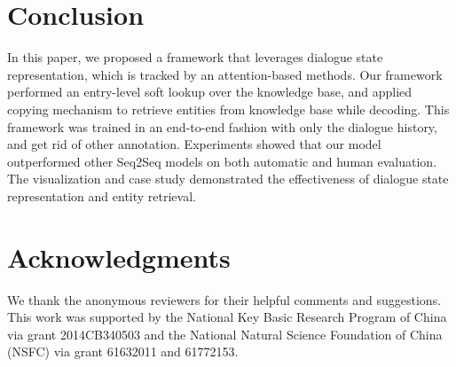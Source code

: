 \documentclass[11pt]{article}
\begin{document}
\section{Conclusion}
In this paper, we proposed a framework that leverages dialogue state representation, which is tracked by an attention-based methods. Our framework performed an entry-level soft lookup over the knowledge base, and applied copying mechanism to retrieve entities from knowledge base while decoding. This framework was trained in an end-to-end fashion with only the dialogue history, and get rid of other annotation. Experiments showed that our model outperformed other Seq2Seq models on both automatic and human evaluation. The visualization and case study demonstrated the effectiveness of dialogue state representation and entity retrieval.

\section{Acknowledgments}
We thank the anonymous reviewers for their helpful comments and suggestions.
This work was supported by the National Key Basic Research
Program of China via grant 2014CB340503 and the
National Natural Science Foundation of China (NSFC) via
grant 61632011 and 61772153.
\end{document}
